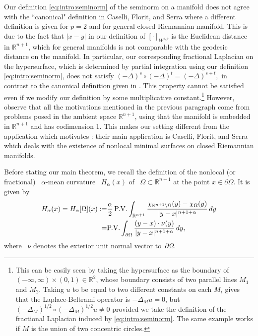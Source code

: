 \documentclass[reqno,12pt]{amsart}
\newcommand{\R}{\mathbb{R}}
\newcommand{\PV}{\mbox{\normalfont P.V.}}
\newcommand{\delomega}{\partial\Omega}
\numberwithin{equation}{section}
\theoremstyle{plain}
\theoremstyle{definition}
\begin{document}
Our definition \eqref{eq:intro:seminorm} of the seminorm on a manifold does not agree with the ``canonical" definition  in Caselli, Florit, and Serra \cite{caselli2024fractional} where a different definition is given for $p=2$ and for general closed Riemannian manifold. This is due to the fact that $|x-y|$ in our definition of $[\cdot]_{W^{s,p}}$ is the Euclidean distance in $\R^{n+1}$, which for general manifolds is not comparable with the geodesic distance on the manifold. In particular, our corresponding fractional Laplacian on the hypersurface, which is determined by partial integration using our definition \eqref{eq:intro:seminorm}, does not satisfy $(-\Delta)^s\circ(-\Delta)^t=(-\Delta)^{s+t},$ in contrast to the canonical definition given in \cite{caselli2024fractional}. This property cannot be satisfied even if we modify our definition by some multiplicative constant.\footnote{This can be easily seen by taking the hypersurface as the boundary of $(-\infty,\infty)\times(0,1)\in\R^2$, whose boundary consists of two parallel lines $M_1$ and $M_2$. Taking $u$ to be equal to two different constants on each $M_i$ gives that the Laplace-Beltrami operator is $-\Delta_Mu=0$, but $(-\Delta_M)^{1/2}\circ (-\Delta_M)^{1/2} u\neq 0$ provided we take the definition of the fractional Laplacian induced by \eqref{eq:intro:seminorm}. The same example works if $M$ is the union of two concentric circles.}
However, observe that all the motivations mentioned in the previous paragraph come from problems posed in the ambient space $\R^{n+1}$, using that the manifold is embedded in $\R^{n+1}$ and has codimension $1$. This makes our setting different from the application which motivates \cite{caselli2024fractional}: their main application is  Caselli, Florit, and Serra \cite{SerraYausconj} which deals with the existence of nonlocal minimal surfaces on closed Riemannian manifolds.  


Before stating our main theorem, we recall the definition of the nonlocal (or fractional) ~$\alpha$-mean curvature ~$H_{\alpha}(x)$  of ~$\Omega\subset\R^{n+1}$ at the point $x \in \partial \Omega$. It is given by 
\begin{equation} \label{Halphadef}
 \begin{split}
H_{\alpha}(x) = H_{\alpha}[\Omega](x) :=& \frac{\alpha}{2} \, \PV \int_{\R^{n+1}}\frac{\chi_{\R^{n + 1} \setminus \Omega}(y)-\chi_{\Omega}(y)}{|y-x|^{n+1+\alpha}} \, dy
\\
=&
   \PV \int_{\delomega} \frac{(y - x) \cdot \nu(y)}{|y - x|^{n + 1 + \alpha}}\,dy,
\end{split}
\end{equation}
where ~$\nu$ denotes the exterior unit normal vector to~$\partial\Omega$.
\end{document}
